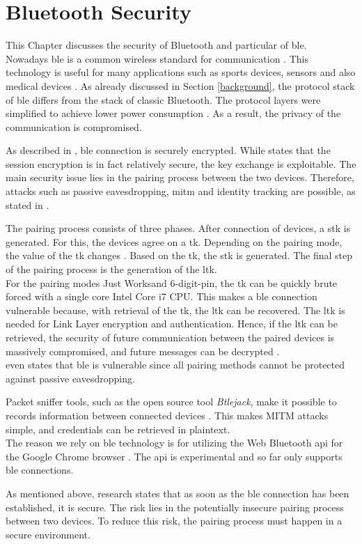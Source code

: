 \section{Bluetooth Security} \label{bluetooth}
This Chapter discusses the security of Bluetooth and particular of \gls{ble}. \\
Nowadays \gls{ble} is a common wireless standard for communication \cite{IntroductionBLE}. This technology is useful for many applications such as sports devices, sensors and also medical devices \cite{Ryan13}.
As already discussed in Section \ref{background}, the protocol stack of \gls{ble} differs from the stack of classic Bluetooth. The protocol layers were simplified to achieve lower power consumption \cite{Ryan13}. As a result, the privacy of the communication is compromised.

As described in \cite{GomezOP12}, \gls{ble} connection is securely encrypted. While \cite{Ryan13} states that the session encryption is in fact relatively secure, the key exchange is exploitable. The main security issue lies in the pairing process between the two devices. Therefore, attacks such as passive eavesdropping, \gls{mitm} and identity tracking are possible, as stated in \cite{IntroductionBLE}.

The pairing process consists of three phases. After connection of devices, a \gls{stk} is generated. For this, the devices agree on a \gls{tk}. Depending on the pairing mode, the value of the \gls{tk} changes \cite{Ryan13}. Based on the \gls{tk}, the \gls{stk} is generated. The final step of the pairing process is the generation of the \gls{ltk}. \\
For the pairing modes Just Works\texttrademark and 6-digit-pin, the \gls{tk} can be quickly brute forced with a single core Intel Core i7 CPU. This makes a \gls{ble} connection vulnerable because, with retrieval of the \gls{tk}, the \gls{ltk} can be recovered. The \gls{ltk} is needed for Link Layer encryption and authentication. Hence, if the \gls{ltk} can be retrieved, the security of future communication between the paired devices is massively compromised, and future messages can be decrypted \cite{Ryan13}. \\
\cite{GomezOP12} even states that \gls{ble} is vulnerable since all pairing methods cannot be protected against passive eavesdropping. 

Packet sniffer tools, such as the open source tool \textit{Btlejack}, make it possible to records information between connected devices \cite{BtleJack}. This makes MITM attacks simple, and credentials can be retrieved in plaintext. \\
The reason we rely on \gls{ble} technology is for utilizing the Web Bluetooth \gls{api} for the Google Chrome browser \cite{WebBTAPI}. The \gls{api} is experimental and so far only supports \gls{ble} connections. 

As mentioned above, research \cite{Ryan13} states that as soon as the \gls{ble} connection has been established, it is secure. The risk lies in the potentially insecure pairing process between two devices. To reduce this risk, the pairing process must happen in a secure environment.
